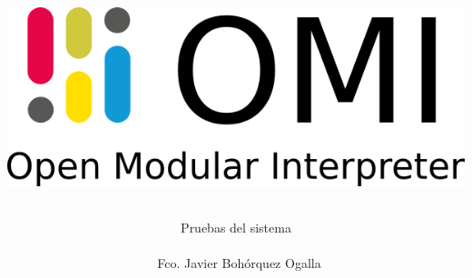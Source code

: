 \documentclass[12pt, spanish]{article}
\author{Pruebas del sistema\\\\\ Fco. Javier Bohórquez Ogalla}						%
\date{}														%
\title{ 
\begin{center}
\includegraphics[scale=0.5]{logo-doc.png}
\end{center} 
}
\begin{document}
\maketitle
\pagebreak
\tableofcontents
\pagebreak

\end{document}
